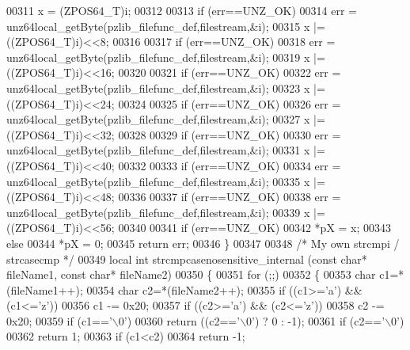 \begin{DoxyCode}
00311     x = (ZPOS64\_T)i;
00312 
00313     \textcolor{keywordflow}{if} (err==UNZ\_OK)
00314         err = unz64local\_getByte(pzlib\_filefunc\_def,filestream,&i);
00315     x |= ((ZPOS64\_T)i)<<8;
00316 
00317     \textcolor{keywordflow}{if} (err==UNZ\_OK)
00318         err = unz64local\_getByte(pzlib\_filefunc\_def,filestream,&i);
00319     x |= ((ZPOS64\_T)i)<<16;
00320 
00321     \textcolor{keywordflow}{if} (err==UNZ\_OK)
00322         err = unz64local\_getByte(pzlib\_filefunc\_def,filestream,&i);
00323     x |= ((ZPOS64\_T)i)<<24;
00324 
00325     \textcolor{keywordflow}{if} (err==UNZ\_OK)
00326         err = unz64local\_getByte(pzlib\_filefunc\_def,filestream,&i);
00327     x |= ((ZPOS64\_T)i)<<32;
00328 
00329     \textcolor{keywordflow}{if} (err==UNZ\_OK)
00330         err = unz64local\_getByte(pzlib\_filefunc\_def,filestream,&i);
00331     x |= ((ZPOS64\_T)i)<<40;
00332 
00333     \textcolor{keywordflow}{if} (err==UNZ\_OK)
00334         err = unz64local\_getByte(pzlib\_filefunc\_def,filestream,&i);
00335     x |= ((ZPOS64\_T)i)<<48;
00336 
00337     \textcolor{keywordflow}{if} (err==UNZ\_OK)
00338         err = unz64local\_getByte(pzlib\_filefunc\_def,filestream,&i);
00339     x |= ((ZPOS64\_T)i)<<56;
00340 
00341     \textcolor{keywordflow}{if} (err==UNZ\_OK)
00342         *pX = x;
00343     \textcolor{keywordflow}{else}
00344         *pX = 0;
00345     \textcolor{keywordflow}{return} err;
00346 \}
00347 
00348 \textcolor{comment}{/* My own strcmpi / strcasecmp */}
00349 local \textcolor{keywordtype}{int} strcmpcasenosensitive\_internal (\textcolor{keyword}{const} \textcolor{keywordtype}{char}* fileName1, \textcolor{keyword}{const} \textcolor{keywordtype}{char}* fileName2)
00350 \{
00351     \textcolor{keywordflow}{for} (;;)
00352     \{
00353         \textcolor{keywordtype}{char} c1=*(fileName1++);
00354         \textcolor{keywordtype}{char} c2=*(fileName2++);
00355         \textcolor{keywordflow}{if} ((c1>=\textcolor{charliteral}{'a'}) && (c1<=\textcolor{charliteral}{'z'}))
00356             c1 -= 0x20;
00357         \textcolor{keywordflow}{if} ((c2>=\textcolor{charliteral}{'a'}) && (c2<=\textcolor{charliteral}{'z'}))
00358             c2 -= 0x20;
00359         \textcolor{keywordflow}{if} (c1==\textcolor{charliteral}{'\(\backslash\)0'})
00360             \textcolor{keywordflow}{return} ((c2==\textcolor{charliteral}{'\(\backslash\)0'}) ? 0 : -1);
00361         \textcolor{keywordflow}{if} (c2==\textcolor{charliteral}{'\(\backslash\)0'})
00362             \textcolor{keywordflow}{return} 1;
00363         \textcolor{keywordflow}{if} (c1<c2)
00364             \textcolor{keywordflow}{return} -1;

\end{DoxyCode}

